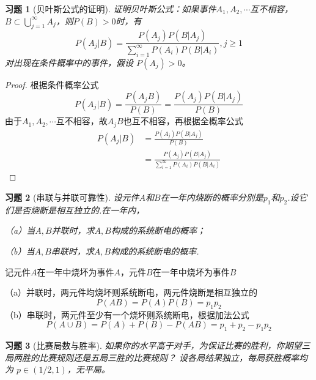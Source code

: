 \documentclass[12pt,fontset=fandol]{ctexart}
\newtheorem{exercise}{习题}[section]
\begin{document}
\begin{exercise}[贝叶斯公式的证明]\label{q:Y2.31}
证明贝叶斯公式：如果事件$A_1,A_2,\cdots$互不相容，$B\subset \bigcup\limits_{j = 1}^\infty  {{A_j}} $，则$P(B)>0$时，有
\[P({A_j}|B) = \frac{{P({A_j})P(B|{A_j})}}{{\sum\limits_{i = 1}^\infty  {P({A_i})P(B|{A_i})} }},j \geqslant 1\] 对出现在条件概率中的事件，假设 $P(A_j)>0$。\par{}
\end{exercise}

\begin{proof}\label{a:Y2.31}
根据条件概率公式
  \[P({A_j}|B) = \frac{{P({A_j}B)}}{{P(B)}} = \frac{{P({A_j})P(B|{A_j})}}{{P(B)}}\]
由于$A_1,A_2,\cdots$互不相容，故$A_jB$也互不相容，再根据全概率公式
\[\begin{aligned}P({A_j}|B) &= \frac{{P({A_j})P(B|{A_j})}}{{P(B)}} \\&= \frac{{P({A_j})P(B|{A_j})}}{{\sum\limits_{i = 1}^\infty  {P({A_i})P(B|{A_i})} }}\end{aligned}\]

\end{proof}

\begin{exercise}[串联与并联可靠性]\label{q:Y2.32}
设元件$A$和$B$在一年内烧断的概率分别是$p_1$和$p_2$.设它们是否烧断是相互独立的.在一年内，

（a）当$A,B$并联时，求$A,B$构成的系统断电的概率；

（b）当$A,B$串联时，求$A,B$构成的系统断电的概率.\par{}
\end{exercise}

\begin{solve}\label{a:Y2.32}
记元件$A$在一年中烧坏为事件$A$，元件$B$在一年中烧坏为事件$B$

（a）并联时，两元件均烧坏则系统断电，两元件烧断是相互独立的
\[P(AB) = P(A)P(B) = {p_1}{p_2}\]
（b）串联时，两元件至少有一个烧坏则系统断电，根据加法公式
\[P(A \cup B) = P(A) + P(B) - P(AB) = {p_1} + {p_2} - {p_1}{p_2}\]
\end{solve}

\begin{exercise}[比赛局数与胜率]\label{q:Y2.33}
如果你的水平高于对手，为保证比赛的胜利，你期望三局两胜的比赛规则还是五局三胜的比赛规则？ 设各局结果独立，每局获胜概率均为 $p\in(1/2,1)$，无平局。\par{}
\end{exercise}
\end{document}
